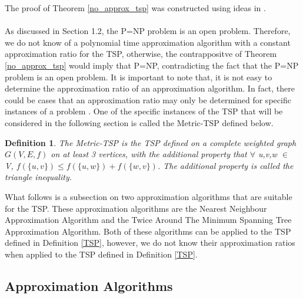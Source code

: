 \documentclass{article}
\newtheorem{definition}{Definition}[subsection]
\begin{document}
The proof of Theorem \ref{no_approx_tsp} was constructed using ideas in \cite{cormen_leiserson_rivest_stein}.\\\\
As discussed in Section 1.2, the P=NP problem is an open problem. Therefore, we do not know of a polynomial time approximation algorithm with a constant approximation ratio for the TSP, otherwise, the contrappositve of Theorem \ref{no_approx_tsp} would imply that P=NP, contradicting the fact that the P=NP problem is an open problem. It is important to note that, it is not easy to determine the approximation ratio of an approximation algorithm. In fact, there could be cases that an approximation ratio may only be determined for specific instances of a problem \cite{cormen_leiserson_rivest_stein}. One of the specific instances of the TSP that will be considered in the following section is called the Metric-TSP defined below.
\begin{definition}
\label{Metric-TSP}
The Metric-TSP is the TSP defined on a complete weighted graph $G(V,E,f)$ on at least 3 vertices, with the additional property that $\forall$ u,v,w $\in$ V, $f(\{u,v\}) \leq f(\{u,w\}) + f(\{w,v\})$. The additional property is called the triangle inequality. {}
\end{definition}
 What follows is a subsection on two approximation algorithms that are suitable for the TSP. These approximation algorithms are the Nearest Neighbour Approximation Algorithm and the Twice Around The Minimum Spanning Tree Approximation Algorithm. Both of these algorithms can be applied to the TSP defined in Definition \ref{TSP}, however, we do not know their approximation ratios when applied to the TSP defined in Definition \ref{TSP}. 
\subsection{Approximation Algorithms}
\end{document}
